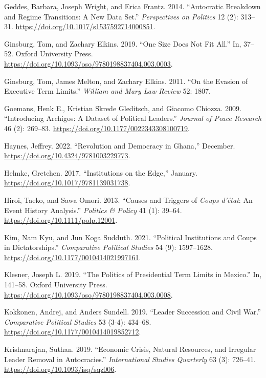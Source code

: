 \documentclass[
  12pt,
]{report}
\newlength{\cslhangindent}
\newenvironment{CSLReferences}[2] %
 {\begin{list}{}{%
  \setlength{\itemindent}{0pt}
  \setlength{\leftmargin}{0pt}
  \setlength{\parsep}{0pt}
  \ifodd #1
   \setlength{\leftmargin}{\cslhangindent}
   \setlength{\itemindent}{-1\cslhangindent}
  \fi
  \setlength{\itemsep}{#2\baselineskip}}}
 {\end{list}}
\begin{document}
\begin{CSLReferences}{1}{0}
Geddes, Barbara, Joseph Wright, and Erica Frantz. 2014. {``Autocratic
Breakdown and Regime Transitions: A New Data Set.''} \emph{Perspectives
on Politics} 12 (2): 313--31.
\url{https://doi.org/10.1017/s1537592714000851}.

Ginsburg, Tom, and Zachary Elkins. 2019. {``One Size Does Not Fit
All.''} In, 37--52. Oxford University Press.
\url{https://doi.org/10.1093/oso/9780198837404.003.0003}.

Ginsburg, Tom, James Melton, and Zachary Elkins. 2011. {``On the Evasion
of Executive Term Limits.''} \emph{William and Mary Law Review} 52:
1807.

Goemans, Henk E., Kristian Skrede Gleditsch, and Giacomo Chiozza. 2009.
{``Introducing Archigos: A Dataset of Political Leaders.''}
\emph{Journal of Peace Research} 46 (2): 269--83.
\url{https://doi.org/10.1177/0022343308100719}.

Haynes, Jeffrey. 2022. {``Revolution and Democracy in Ghana,''}
December. \url{https://doi.org/10.4324/9781003229773}.

Helmke, Gretchen. 2017. {``Institutions on the Edge,''} January.
\url{https://doi.org/10.1017/9781139031738}.

Hiroi, Taeko, and Sawa Omori. 2013. {``Causes and Triggers of
{\emph{Coups d'état}}: An Event History Analysis.''} \emph{Politics \&
Policy} 41 (1): 39--64. \url{https://doi.org/10.1111/polp.12001}.

Kim, Nam Kyu, and Jun Koga Sudduth. 2021. {``Political Institutions and
Coups in Dictatorships.''} \emph{Comparative Political Studies} 54 (9):
1597--1628. \url{https://doi.org/10.1177/0010414021997161}.

Klesner, Joseph L. 2019. {``The Politics of Presidential Term Limits in
Mexico.''} In, 141--58. Oxford University Press.
\url{https://doi.org/10.1093/oso/9780198837404.003.0008}.

Kokkonen, Andrej, and Anders Sundell. 2019. {``Leader Succession and
Civil War.''} \emph{Comparative Political Studies} 53 (3-4): 434--68.
\url{https://doi.org/10.1177/0010414019852712}.

Krishnarajan, Suthan. 2019. {``Economic Crisis, Natural Resources, and
Irregular Leader Removal in Autocracies.''} \emph{International Studies
Quarterly} 63 (3): 726--41. \url{https://doi.org/10.1093/isq/sqz006}.


\end{CSLReferences}
\end{document}
